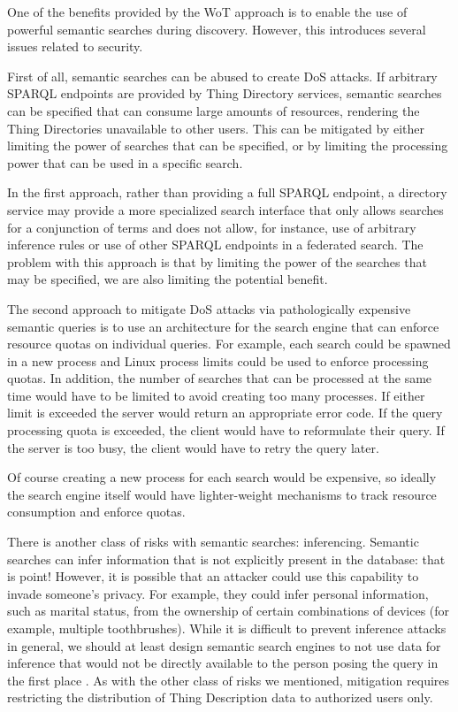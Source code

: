 One of the benefits provided by the WoT approach is to
enable the use of powerful semantic searches during discovery.
However, this introduces several issues related to security.

First of all, semantic searches can be abused to create DoS attacks.
If arbitrary SPARQL endpoints are provided by Thing Directory
services, semantic searches can be specified
that can consume large amounts of resources,
rendering the Thing Directories unavailable to other users.
This can be mitigated by either limiting the power of searches
that can be specified, or by limiting the processing
power that can be used in a specific search.

In the first approach, rather than providing a full
SPARQL endpoint, a directory service may provide a more specialized
search interface that only allows searches for a conjunction of terms
and does not allow, for instance, use of arbitrary inference rules
or use of other SPARQL endpoints in a federated search.
The problem with this approach is that by limiting the power
of the searches that may be specified, we are also limiting the
potential benefit.

The second approach to mitigate DoS attacks via pathologically
expensive semantic queries is to use an architecture for the 
search engine that can enforce resource quotas on individual queries.
For example, each search could be spawned in a new process and Linux
process limits could be used to enforce processing quotas. In addition,
the number of searches that can be processed at the same time would
have to be limited to avoid creating too many processes.
If either limit is exceeded the server would return an appropriate
error code.  If the query processing quota is exceeded, the client
would have to reformulate their query.  If the server is too busy,
the client would have to retry the query later.

Of course creating a new process for each search would be expensive,
so ideally the search engine itself would have lighter-weight
mechanisms to track resource consumption and enforce quotas.

There is another class of risks with semantic searches: 
inferencing.  Semantic searches can infer information that is
not explicitly present in the database: that is point!
However, it is possible that an attacker could use this capability
to invade someone's privacy.  For example, they could infer
personal information, such as marital status, from the ownership
of certain combinations of devices (for example, multiple toothbrushes).
While it is difficult to prevent inference attacks in general,
we should at least design semantic search engines to not use 
data for inference that would not be directly available to the
person posing the query in the first place \cite{Thura2005a,Xia2014a}.  
As with the other class of risks we mentioned,
mitigation requires restricting the distribution of Thing Description
data to authorized users only.
